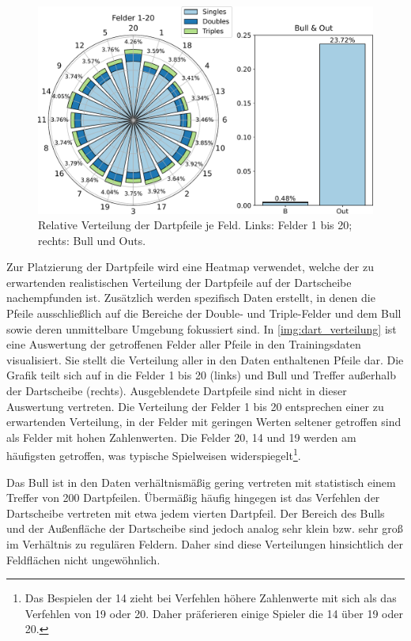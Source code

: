 \begin{figure}
    \centering
    \includegraphics[width=\textwidth]{imgs/rendering/ergebnisse/dartboard_stacked_final.pdf}
    \caption{Relative Verteilung der Dartpfeile je Feld. Links: Felder 1 bis 20; rechts: Bull und Outs.}
    \label{img:dart_verteilung}
\end{figure}

Zur Platzierung der Dartpfeile wird eine Heatmap verwendet, welche der zu erwartenden realistischen Verteilung der Dartpfeile auf der Dartscheibe nachempfunden ist. Zusätzlich werden spezifisch Daten erstellt, in denen die Pfeile ausschließlich auf die Bereiche der Double- und Triple-Felder und dem Bull sowie deren unmittelbare Umgebung fokussiert sind. In \autoref{img:dart_verteilung} ist eine Auswertung der getroffenen Felder aller Pfeile in den Trainingsdaten visualisiert. Sie stellt die Verteilung aller in den Daten enthaltenen Pfeile dar. Die Grafik teilt sich auf in die Felder 1 bis 20 (links) und Bull und Treffer außerhalb der Dartscheibe (rechts). Ausgeblendete Dartpfeile sind nicht in dieser Auswertung vertreten. Die Verteilung der Felder 1 bis 20 entsprechen einer zu erwartenden Verteilung, in der Felder mit geringen Werten seltener getroffen sind als Felder mit hohen Zahlenwerten. Die Felder 20, 14 und 19 werden am häufigsten getroffen, was typische Spielweisen widerspiegelt\footnote{Das Bespielen der 14 zieht bei Verfehlen höhere Zahlenwerte mit sich als das Verfehlen von 19 oder 20. Daher präferieren einige Spieler die 14 über 19 oder 20.}.

Das Bull ist in den Daten verhältnismäßig gering vertreten mit statistisch einem Treffer von 200 Dartpfeilen. Übermäßig häufig hingegen ist das Verfehlen der Dartscheibe vertreten mit etwa jedem vierten Dartpfeil. Der Bereich des Bulls und der Außenfläche der Dartscheibe sind jedoch analog sehr klein bzw. sehr groß im Verhältnis zu regulären Feldern. Daher sind diese Verteilungen hinsichtlich der Feldflächen nicht ungewöhnlich.

